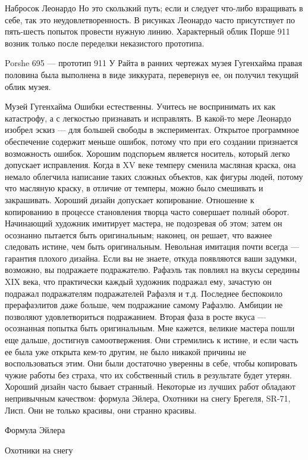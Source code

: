 \documentclass[ebook,12pt,oneside,openany]{memoir}
\begin{document}
Набросок Леонардо Но это скользкий путь; если и следует что-либо
взращивать в себе, так это неудовлетворенность. В рисунках Леонардо
часто присутствует по пять-шесть попыток провести нужную линию.
Характерный облик Порше 911 возник только после переделки неказистого
прототипа.

Porshe 695 — прототип 911 У Райта в ранних чертежах музея Гугенхайма
правая половина была выполнена в виде зиккурата, перевернув ее, он
получил текущий облик музея.

Музей Гугенхайма Ошибки естественны. Учитесь не воспринимать их как
катастрофу, а с легкостью признавать и исправлять. В какой-то мере
Леонардо изобрел эскиз — для большей свободы в экспериментах. Открытое
программное обеспечение содержит меньше ошибок, потому что при его
создании признается возможность ошибок. Хорошим подспорьем является
носитель, который легко допускает исправления. Когда в XV веке темперу
сменила масляная краска, она немало облегчила написание таких сложных
объектов, как фигуры людей, потому что масляную краску, в отличие от
темперы, можно было смешивать и закрашивать. Хороший дизайн допускает
копирование. Отношение к копированию в процессе становления творца
часто совершает полный оборот. Начинающий художник имитирует мастера,
не подозревая об этом; затем он осознанно пытается быть оригинальным;
наконец, он решает, что важнее следовать истине, чем быть
оригинальным. Невольная имитация почти всегда — гарантия плохого
дизайна. Если вы не знаете, откуда появляются ваши задумки, возможно,
вы подражаете подражателю. Рафаэль так повлиял на вкусы середины XIX
века, что практически каждый художник подражал ему, зачастую он
подражал подражателям подражателей Рафаэля и т.д. Последнее беспокоило
прерафаэлитов даже больше, чем подражание самому Рафаэлю. Амбиции не
позволяют удовлетвориться подражанием. Вторая фаза в росте вкуса —
осознанная попытка быть оригинальным. Мне кажется, великие мастера
пошли еще дальше, достигнув самоотвержения. Они стремились к истине, и
если часть ее была уже открыта кем-то другим, не было никакой причины
не воспользоваться этим. Они были достаточно уверенны в себе, чтобы
копировать чужие работы без страха, что их собственный стиль в
результате будет утерян. Хороший дизайн часто бывает странный.
Некоторые из лучших работ обладают непривычным качеством: формула
Эйлера, Охотники на снегу Брегеля, SR-71, Лисп. Они не только красивы,
они странно красивы.

Формула Эйлера

Охотники на снегу
\end{document}
